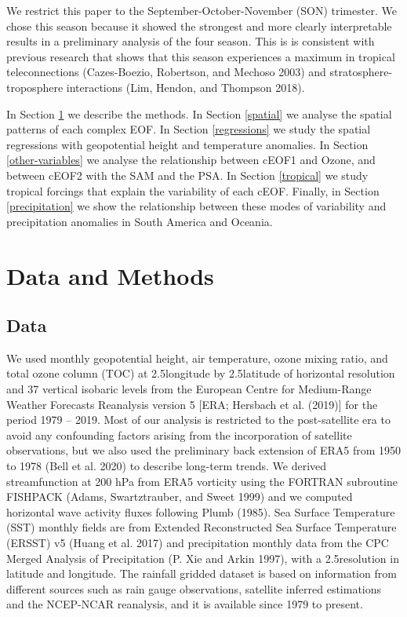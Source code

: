 \documentclass[smallextended]{svjour3}       %
\begin{document}
We restrict this paper to the September-October-November (SON) trimester.
We chose this season because it showed the strongest and more clearly interpretable results in a preliminary analysis of the four season.
This is is consistent with previous research that shows that this season experiences a maximum in tropical teleconnections (Cazes-Boezio, Robertson, and Mechoso 2003) and stratosphere-troposphere interactions (Lim, Hendon, and Thompson 2018).

In Section \ref{methods} we describe the methods.
In Section \ref{spatial} we analyse the spatial patterns of each complex EOF.
In Section \ref{regressions} we study the spatial regressions with geopotential height and temperature anomalies.
In Section \ref{other-variables} we analyse the relationship between cEOF1 and Ozone, and between cEOF2 with the SAM and the PSA.
In Section \ref{tropical} we study tropical forcings that explain the variability of each cEOF.
Finally, in Section \ref{precipitation} we show the relationship between these modes of variability and precipitation anomalies in South America and Oceania.

\hypertarget{methods}{%
\section{Data and Methods}\label{methods}}

\hypertarget{data}{%
\subsection{Data}\label{data}}

We used monthly geopotential height, air temperature, ozone mixing ratio, and total ozone column (TOC) at 2.5\degree longitude by 2.5\degree latitude of horizontal resolution and 37 vertical isobaric levels from the European Centre for Medium-Range Weather Forecasts Reanalysis version 5 {[}ERA; Hersbach et al. (2019){]} for the period 1979 -- 2019.
Most of our analysis is restricted to the post-satellite era to avoid any confounding factors arising from the incorporation of satellite observations, but we also used the preliminary back extension of ERA5 from 1950 to 1978 (Bell et al. 2020) to describe long-term trends.
We derived streamfunction at 200 hPa from ERA5 vorticity using the FORTRAN subroutine FISHPACK (Adams, Swartztrauber, and Sweet 1999) and we computed horizontal wave activity fluxes following Plumb (1985).
Sea Surface Temperature (SST) monthly fields are from Extended Reconstructed Sea Surface Temperature (ERSST) v5 (Huang et al. 2017) and precipitation monthly data from the CPC Merged Analysis of Precipitation (P. Xie and Arkin 1997), with a 2.5\degree resolution in latitude and longitude.
The rainfall gridded dataset is based on information from different sources such as rain gauge observations, satellite inferred estimations and the NCEP-NCAR reanalysis, and it is available since 1979 to present.
\end{document}

